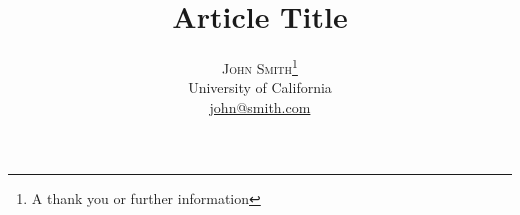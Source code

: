 \documentclass[twoside]{article}\usepackage[]{graphicx}\usepackage[]{color}
\title{\vspace{-15mm}\fontsize{24pt}{10pt}\selectfont\textbf{Article Title}} %
\author{
\large
\textsc{John Smith}\thanks{A thank you or further information}\\[2mm] %
\normalsize University of California \\ %
\normalsize \href{mailto:john@smith.com}{john@smith.com} %
\vspace{-5mm}
}
\date{}
\begin{document}
\maketitle %

\thispagestyle{fancy} %





\begin{abstract}

\lipsum[1]

\end{abstract}




\end{document}
